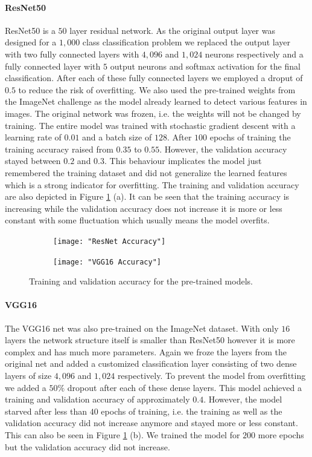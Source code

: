 \documentclass{article}
\begin{document}
\paragraph{ResNet50} ResNet50 \cite{he2016deep} is a $50$ layer residual network. As the original output layer was designed for a $1,000$ class classification problem we replaced the output layer with two fully connected layers with $4,096$ and $1,024$ neurons respectively and a fully connected layer with $5$ output neurons and softmax activation for the final classification. After each of these fully connected layers we employed a droput of $0.5$ to reduce the risk of overfitting. We also used the pre-trained weights from the ImageNet challenge as the model already learned to detect various features in images. The original network was frozen, i.e. the weights will not be changed by training. The entire model was trained with stochastic gradient descent with a learning rate of $0.01$ and a batch size of $128$. After $100$ epochs of training the training accuracy raised from $0.35$ to $0.55$. However, the validation accuracy stayed between $0.2$ and $0.3$. This behaviour implicates the model just remembered the training dataset and did not generalize the learned features which is a strong indicator for overfitting. The training and validation accuracy are also depicted in Figure \ref{fig:acc} (a). It can be seen that the training accuracy is increasing while the validation accuracy does not increase it is more or less constant with some fluctuation which usually means the model overfits.

\begin{figure}
  \begin{subfigure}{0.23\textwidth}
    \centering
    \texttt{[image: "ResNet Accuracy"]}
  \end{subfigure}
  \begin{subfigure}{0.23\textwidth}
    \centering
    \texttt{[image: "VGG16 Accuracy"]}
  \end{subfigure}
  \caption{Training and validation accuracy for the pre-trained models.}
  \label{fig:acc}
\end{figure}

\paragraph{VGG16} The VGG16 net \citep{simonyan2014very} was also pre-trained on the ImageNet dataset. With only $16$ layers the network structure itself is smaller than ResNet50 however it is more complex and has much more parameters. Again we froze the layers from the original net and added a customized classification layer consisting of two dense layers of size $4,096$ and $1,024$ respectively. To prevent the model from overfitting we added a $50 \%$ dropout after each of these dense layers. This model achieved a training and validation accuracy of approximately $0.4$. However, the model starved after less than $40$ epochs of training, i.e. the training as well as the validation accuracy did not increase anymore and stayed more or less constant. This can also be seen in Figure \ref{fig:acc} (b). We trained the model for $200$ more epochs but the validation accuracy did not increase.
\end{document}
